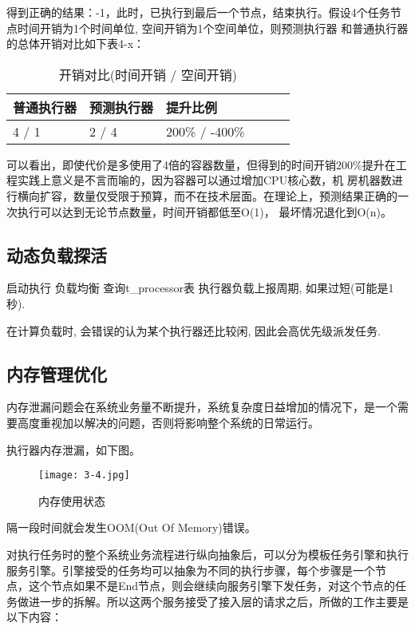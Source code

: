 得到正确的结果：-1，此时，已执行到最后一个节点，结束执行。假设4个任务节点时间开销为1个时间单位, 空间开销为1个空间单位，则预测执行器
和普通执行器的总体开销对比如下表4-x：

\begin{table}[H]
    \centering
    \caption{开销对比(时间开销 / 空间开销)}
    \label{tab:cost}
    \begin{tabular}{llllll}
        \toprule
        普通执行器 & 预测执行器 & 提升比例 \\
        \midrule
        4 / 1   &2 / 4   &200\% / -400\% \\
        \bottomrule
    \end{tabular}
\end{table}

可以看出，即使代价是多使用了4倍的容器数量，但得到的时间开销200\%提升在工程实践上意义是不言而喻的，因为容器可以通过增加CPU核心数，机
房机器数进行横向扩容，数量仅受限于预算，而不在技术层面。在理论上，预测结果正确的一次执行可以达到无论节点数量，时间开销都低至O(1)，
最坏情况退化到O(n)。

\subsection{动态负载探活}
启动执行 负载均衡 查询t\_processor表 执行器负载上报周期, 如果过短(可能是1秒).

在计算负载时, 会错误的认为某个执行器还比较闲, 因此会高优先级派发任务.


\subsection{内存管理优化}

内存泄漏问题会在系统业务量不断提升，系统复杂度日益增加的情况下，是一个需要高度重视加以解决的问题，否则将影响整个系统的日常运行。

执行器内存泄漏，如下图。

\begin{figure}[H]
    \centering
    \texttt{[image: 3-4.jpg]}
    \caption{内存使用状态}
    \label{fig:ncsyzt}
\end{figure}

隔一段时间就会发生OOM(Out Of Memory)错误。

对执行任务时的整个系统业务流程进行纵向抽象后，可以分为模板任务引擎和执行服务引擎。引擎接受的任务均可以抽象为不同的执行步骤，每个步骤是一个节
点，这个节点如果不是End节点，则会继续向服务引擎下发任务，对这个节点的任务做进一步的拆解。所以这两个服务接受了接入层的请求之后，所做的工作主要是以下内容：

